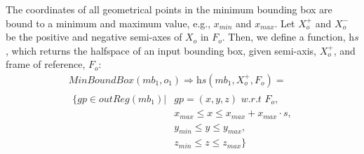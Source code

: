 \documentclass{article}
\begin{document}
The coordinates of all geometrical points in the minimum bounding box are bound to a minimum and maximum value, e.g., $x_{min}$ and $x_{max}$. Let $X_{o}^{+}$ and $X_{o}^{-}$ be the positive and negative semi-axes of $X_o$ in $F_o$. Then, we define a function, $\textit{hs}$, which returns the halfspace of an input bounding box, given semi-axis, $X_{o}^{+}$, and frame of reference, $F_o$:
\begin{multline}
    \textit{MinBoundBox}(mb_1,o_1) \Rightarrow  \textit{hs}(mb_1,X_{o}^{+}, F_o) = \\
\begin{split}
    \{gp \in \textit{outReg}(mb_1)| &{} gp=(x,y,z) \textit{ w.r.t } F_o,   \\
   & x_{max} \leq x \leq x_{max} + x_{max} \cdot s , \\
   &  y_{min} \leq y \leq y_{max}, \\
   &  z_{min} \leq z \leq z_{max}  \} 
   \end{split}
\end{multline}
\end{document}

